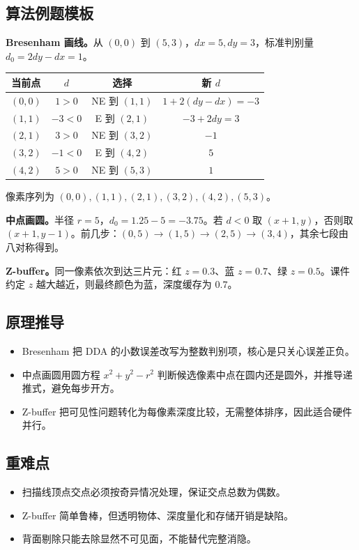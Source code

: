 \documentclass[UTF8,zihao=-4,scheme=chinese,fontset=fandol]{ctexart}
\begin{document}
\subsection{算法例题模板}
\textbf{Bresenham 画线。}从 $(0,0)$ 到 $(5,3)$，$dx=5,dy=3$，标准判别量 $d_0=2dy-dx=1$。
\begin{center}
\begin{tabular}{cccc}
\toprule
当前点 & $d$ & 选择 & 新 $d$\\
\midrule
$(0,0)$ & $1>0$ & NE 到 $(1,1)$ & $1+2(dy-dx)=-3$\\
$(1,1)$ & $-3<0$ & E 到 $(2,1)$ & $-3+2dy=3$\\
$(2,1)$ & $3>0$ & NE 到 $(3,2)$ & $-1$\\
$(3,2)$ & $-1<0$ & E 到 $(4,2)$ & $5$\\
$(4,2)$ & $5>0$ & NE 到 $(5,3)$ & $1$\\
\bottomrule
\end{tabular}
\end{center}
像素序列为 $(0,0),(1,1),(2,1),(3,2),(4,2),(5,3)$。

\textbf{中点画圆。}半径 $r=5$，$d_0=1.25-5=-3.75$。若 $d<0$ 取 $(x+1,y)$，否则取 $(x+1,y-1)$。前几步：$(0,5)\to(1,5)\to(2,5)\to(3,4)$，其余七段由八对称得到。

\textbf{Z-buffer。}同一像素依次到达三片元：红 $z=0.3$、蓝 $z=0.7$、绿 $z=0.5$。课件约定 $z$ 越大越近，则最终颜色为蓝，深度缓存为 $0.7$。

\subsection{原理推导}
\begin{itemize}
  \item Bresenham 把 DDA 的小数误差改写为整数判别项，核心是只关心误差正负。
  \item 中点画圆用圆方程 $x^2+y^2-r^2$ 判断候选像素中点在圆内还是圆外，并推导递推式，避免每步开方。
  \item Z-buffer 把可见性问题转化为每像素深度比较，无需整体排序，因此适合硬件并行。
\end{itemize}

\subsection{重难点}
\begin{itemize}
  \item 扫描线顶点交点必须按奇异情况处理，保证交点总数为偶数。
  \item Z-buffer 简单鲁棒，但透明物体、深度量化和存储开销是缺陷。
  \item 背面剔除只能去除显然不可见面，不能替代完整消隐。
\end{itemize}
\end{document}
